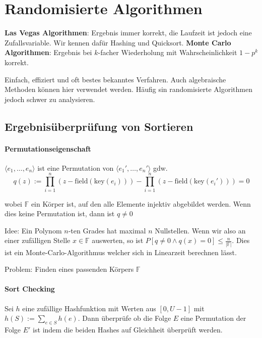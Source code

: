 \chapter{Randomisierte Algorithmen}

\textbf{Las Vegas Algorithmen}: Ergebnis immer korrekt, die Laufzeit ist jedoch eine Zufallsvariable. Wir kennen dafür Hashing und Quicksort.
\textbf{Monte Carlo Algorithmen}: Ergebnis bei $k$-facher Wiederholung mit Wahrscheinlichkeit $1-p^k$ korrekt. 

Einfach, effiziert und oft bestes bekanntes Verfahren. Auch algebraische Methoden können hier verwendet werden. Häufig sin randomisierte Algorithmen jedoch schwer zu analysieren. 

\section{Ergebnisüberprüfung von Sortieren}

\subsubsection{Permutationseigenschaft}
$\langle e_1, \dots , e_n \rangle$ 
ist eine Permutation von 
$\langle e_1', \dots , e_n' \rangle$ 
gdw. 
\begin{equation*}
	q(z):=\prod_{i=1}^n{(z-\text{field}(\text{key}(e_i)))} - \prod_{i=1}^n{(z-\text{field}(\text{key}(e_i')))} = 0
\end{equation*}

wobei $\mathbb{F}$ ein Körper ist, auf den alle Elemente injektiv abgebildet werden. 
Wenn dies keine Permutation ist, dann ist $q \neq 0$


Idee: Ein Polynom $n$-ten Grades hat maximal $n$ Nullstellen. Wenn wir also an einer zufälligen Stelle $x\in \mathbb{F}$ auswerten, so ist $P[q\neq 0 \wedge q(x) = 0] \leq \frac{n}{|\mathbb{F}|}$. 
Dies ist ein Monte-Carlo-Algorithmus welcher sich in Linearzeit berechnen lässt. 

Problem: Finden eines passenden Körpers $\mathbb{F}$

\subsubsection{Sort Checking}

Sei $h$ eine zufällige Hashfunktion mit Werten aus $[0,U-1]$ mit $h(S):= \sum_{e \in S}{h(e)}$.
Dann überprüfe ob die Folge $E$ eine Permutation der Folge $E'$ ist indem die beiden Hashes auf Gleichheit überprüft werden. 


